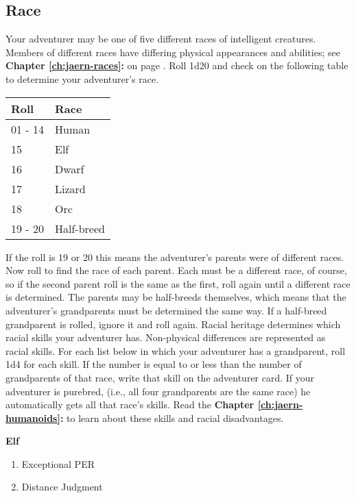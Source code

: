 \begin{multicols*}{2}
\section{Race}
Your adventurer may be one of five different races of intelligent creatures. Members of different races have differing physical appearances and abilities; see \textbf{Chapter \ref{ch:jaern-races}: } on page \textbf{\pageref{jh-races}}. Roll 1d20 and check on the following table to determine your adventurer’s race.
\begin{tcolorbox}[boxrule=0pt]
\begin{tabular}{l l}
Roll & Race\\
\midrule
01 - 14 & Human\\
15 & Elf\\
16 & Dwarf \\
17 & Lizard\\
18 & Orc\\
19 - 20 & Half-breed\\
\end{tabular}
\end{tcolorbox}
If the roll is 19 or 20 this means the adventurer’s parents were of different races. Now roll to find the race of each parent. Each must be a different race, of course, so if the second parent roll is the same as the first, roll again until a different race is determined. The parents may be half-breeds themselves, which means that the adventurer’s grandparents must be determined the same way. If a half-breed grandparent is rolled, ignore it and roll again. Racial heritage determines which racial skills your adventurer has. Non-physical differences are represented as racial skills. For each list below in which your adventurer has a grandparent, roll 1d4 for each skill. If the number is equal to or less than the number of grandparents of that race, write that skill on the adventurer card. If your adventurer is purebred, (i.e., all four grandparents are the same race) he automatically gets all that race's skills. Read the \textbf{Chapter \ref{ch:jaern-humanoids}: } to learn about these skills and racial disadvantages.
\setlength{\columnsep}{0.05cm}
\begin{multicols}{2}
\begin{tcolorbox}[breakable,boxrule=0pt,after skip=0pt]
\textbf{Elf}
\begin{enumerate}[leftmargin=0.1cm]
\item Exceptional PER
\item Distance Judgment

\end{enumerate}
\end{tcolorbox}
\end{multicols}
\end{multicols*}
